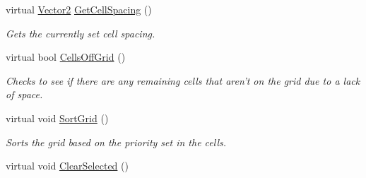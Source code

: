 \begin{DoxyCompactItemize}
virtual \hyperlink{classphys_1_1Vector2}{Vector2} \hyperlink{classphys_1_1UI_1_1CellGrid_a232260f23808cd7099f2f9a15850a14e}{GetCellSpacing} ()
\begin{DoxyCompactList}\small\item\em Gets the currently set cell spacing. \item\end{DoxyCompactList}\item 
virtual bool \hyperlink{classphys_1_1UI_1_1CellGrid_ae901b18d90b8ed0d16da25ccfa91e84e}{CellsOffGrid} ()
\begin{DoxyCompactList}\small\item\em Checks to see if there are any remaining cells that aren't on the grid due to a lack of space. \item\end{DoxyCompactList}\item 
\hypertarget{classphys_1_1UI_1_1CellGrid_ae539f6b21c3ed84852df37153ae2aebf}{
virtual void \hyperlink{classphys_1_1UI_1_1CellGrid_ae539f6b21c3ed84852df37153ae2aebf}{SortGrid} ()}
\label{classphys_1_1UI_1_1CellGrid_ae539f6b21c3ed84852df37153ae2aebf}

\begin{DoxyCompactList}\small\item\em Sorts the grid based on the priority set in the cells. \item\end{DoxyCompactList}\item 
\hypertarget{classphys_1_1UI_1_1CellGrid_ae2ad049f3e426c8a26cca6c59fb853aa}{
virtual void \hyperlink{classphys_1_1UI_1_1CellGrid_ae2ad049f3e426c8a26cca6c59fb853aa}{ClearSelected} ()}
\label{classphys_1_1UI_1_1CellGrid_ae2ad049f3e426c8a26cca6c59fb853aa}


\end{DoxyCompactItemize}
